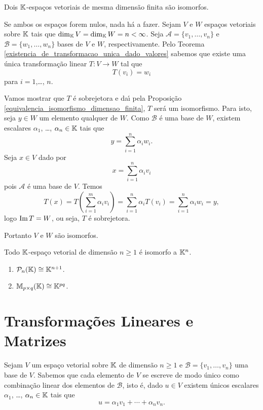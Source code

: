 \begin{teorema}\label{teorema_espacos_isomorfos}
	Dois $\mathbb{K}$-espa\c{c}os vetoriais de mesma dimens\~ao finita s\~ao isomorfos.
\end{teorema}
\begin{prova}
	Se ambos os espa\c{c}os forem nulos, nada h\'a a fazer. Sejam $V$ e $W$ espa\c{c}os vetoriais sobre $\mathbb{K}$ tais que $\dim_{\mathbb{K}}V = \dim_{\mathbb{K}}W = n < \infty$. Seja $\mathcal{A} = \{v_1,\dots,v_n\}$ e $\mathcal{B} = \{w_1,\dots,w_n\}$ bases de $V$ e $W$, respectivamente. Pelo Teorema \ref{existencia_de_transformacao_unica_dado_valores} sabemos que existe uma \'unica transforma\c{c}\~ao linear $T : V \to W$ tal que
	\[
		T(v_i) = w_i
	\]
	para $i=1$,\dots, $n$.

	Vamos mostrar que $T$ \'e sobrejetora e da{\'\i} pela Proposi\c{c}\~ao \ref{equivalencia_isomorfismo_dimensao_finita}, $T$ ser\'a um isomorfismo. Para isto, seja $y \in W$ um elemento qualquer de $W$. Como $\mathcal{B}$ \'e uma base de $W$, existem escalares $\alpha_1$, \dots, $\alpha_n \in \mathbb{K}$ tais que
	\[
		y = \sum_{i=1}^n\alpha_iw_i.
	\]
	Seja $x \in V$ dado por
	\[
		x = \sum_{i=1}^n\alpha_iv_i
	\]
	pois $\mathcal{A}$ \'e uma base de $V$. Temos
	\[
		T(x) = T(\sum_{i=1}^m\alpha_iv_i) = \sum_{i=1}^n\alpha_iT(v_i) = \sum_{i=1}^n\alpha_iw_i = y,
	\]
	logo ${\rm Im\,} T = W$, ou seja, $T$ \'e sobrejetora.

	Portanto $V$ e $W$ s\~ao isomorfos.
\end{prova}

\begin{corolario}
	Todo $\mathbb{K}$-espa\c{c}o vetorial de dimens\~ao $n \ge 1$ \'e isomorfo a $\mathbb{K}^n$.
\end{corolario}

\begin{exemplos}
	\begin{enumerate}[label={\arabic*})]
		\item $\mathcal{P}_n(\mathbb{K}) \cong \mathbb{K}^{n+1}$.
		\item $\mathbb{M}_{p\times q}(\mathbb{K}) \cong \mathbb{K}^{pq}$.
	\end{enumerate}
\end{exemplos}

\section{Transforma\c{c}\~oes Lineares e Matrizes} %
\label{sec:transformacoes_lineares_e_matrizes}

Sejam $V$ um espa\c{c}o vetorial sobre $\mathbb{K}$ de dimens\~ao $n \ge 1$ e $\mathcal{B} = \{v_1,\dots,v_n\}$ uma base de $V$. Sabemos que cada elemento de $V$ se escreve de modo \'unico como combina\c{c}\~ao linear dos elementos de $\mathcal{B}$, isto \'e, dado $u \in V$ existem \'unicos escalares $\alpha_1$, \dots, $\alpha_n \in \mathbb{K}$ tais que
\[
	u = \alpha_1v_1 + \cdots + \alpha_nv_n.
\]

